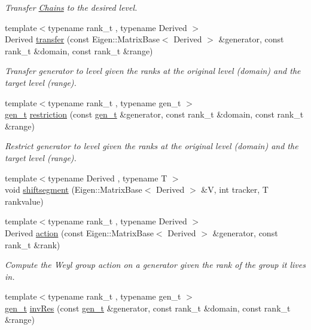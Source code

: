 \begin{DoxyCompactItemize}
\begin{DoxyCompactList}\small\item\em Transfer \hyperlink{classMackey_1_1Chains}{Chains} to the desired level. \end{DoxyCompactList}\item 
{\footnotesize template$<$typename rank\+\_\+t , typename Derived $>$ }\\Derived \hyperlink{namespaceMackey_a0550bf97e47b3c319cb5e1bd81008d89}{transfer} (const Eigen\+::\+Matrix\+Base$<$ Derived $>$ \&generator, const rank\+\_\+t \&domain, const rank\+\_\+t \&range)
\begin{DoxyCompactList}\small\item\em Transfer generator to level given the ranks at the original level (domain) and the target level (range). \end{DoxyCompactList}\item 
{\footnotesize template$<$typename rank\+\_\+t , typename gen\+\_\+t $>$ }\\\hyperlink{namespaceMackey_a6bb0b2796632ba6c7f8ea192f7aecffe}{gen\+\_\+t} \hyperlink{namespaceMackey_ad1e907ff76b07d4fc4c9d4bdf25918bd}{restriction} (const \hyperlink{namespaceMackey_a6bb0b2796632ba6c7f8ea192f7aecffe}{gen\+\_\+t} \&generator, const rank\+\_\+t \&domain, const rank\+\_\+t \&range)
\begin{DoxyCompactList}\small\item\em Restrict generator to level given the ranks at the original level (domain) and the target level (range). \end{DoxyCompactList}\item 
{\footnotesize template$<$typename Derived , typename T $>$ }\\void \hyperlink{namespaceMackey_aab8a6292210a3b71960cb03b79d218e6}{shiftsegment} (Eigen\+::\+Matrix\+Base$<$ Derived $>$ \&V, int tracker, T rankvalue)
\item 
{\footnotesize template$<$typename rank\+\_\+t , typename Derived $>$ }\\Derived \hyperlink{namespaceMackey_aa515b26c0fbc7f19b36cee7d826f07b9}{action} (const Eigen\+::\+Matrix\+Base$<$ Derived $>$ \&generator, const rank\+\_\+t \&rank)
\begin{DoxyCompactList}\small\item\em Compute the Weyl group action on a generator given the rank of the group it lives in. \end{DoxyCompactList}\item 
{\footnotesize template$<$typename rank\+\_\+t , typename gen\+\_\+t $>$ }\\\hyperlink{namespaceMackey_a6bb0b2796632ba6c7f8ea192f7aecffe}{gen\+\_\+t} \hyperlink{namespaceMackey_a30b5667e411ff694aa989e95e394bb41}{inv\+Res} (const \hyperlink{namespaceMackey_a6bb0b2796632ba6c7f8ea192f7aecffe}{gen\+\_\+t} \&generator, const rank\+\_\+t \&domain, const rank\+\_\+t \&range)

\end{DoxyCompactItemize}
